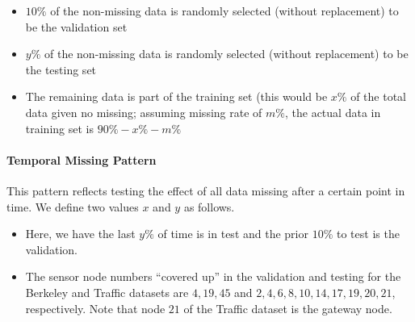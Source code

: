 \begin{itemize}
\item $10\%$ of the non-missing data is randomly selected (without replacement) to be the validation set
\item $y\%$ of the non-missing data is randomly selected (without replacement) to be the testing set
\item The remaining data is part of the training set (this would be $x\%$ of the total data given no missing; assuming missing rate of $m\%$, the actual data in training set is $90\%-x\%-m\%$
\end{itemize}

\paragraph*{Temporal Missing Pattern}

This pattern reflects testing the effect of all data missing after a certain point in time.
We define two values $x$ and $y$ as follows.

\begin{itemize}
\item Here, we have the last $y\%$ of time is in test and the prior $10\%$ to test is the validation.
\item The sensor node numbers ``covered up'' in the validation and testing for the Berkeley and Traffic datasets are ${4,19,45}$ and ${2,4,6,8,10,14,17,19,20,21}$, respectively.
Note that node $21$ of the Traffic dataset is the gateway node.
\end{itemize}
